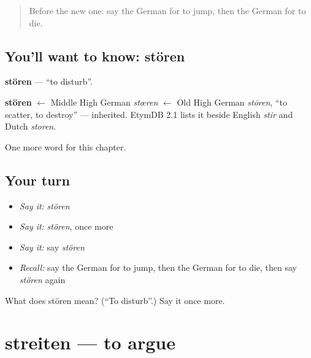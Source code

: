 \label{lesson:GE-C150-stoeren}



\begin{quote}
Before the new one: say the German for to jump, then the German for to die.
\end{quote}

\subsection*{You'll want to know: stören}
\textbf{stören} — \textquotedblleft{}to disturb\textquotedblright{}.

\begin{cousinweb}
\textbf{stören} $\leftarrow$ Middle High German \emph{stœren} $\leftarrow$ Old High German \emph{stōren}, \textquotedblleft{}to scatter, to destroy\textquotedblright{} — inherited. EtymDB 2.1 lists it beside English \emph{stir} and Dutch \emph{storen}.
\end{cousinweb}

\begin{grammarlens}[title={What you've built}]
One more word for this chapter.
\end{grammarlens}

\subsection*{Your turn}
\begin{itemize}
\raggedright
  \item \emph{Say it:} \emph{stören}
  \item \emph{Say it:} \emph{stören}, once more
  \item \emph{Say it:} say \emph{stören}
  \item \emph{Recall:} say the German for to jump, then the German for to die, then say \emph{stören} again
\end{itemize}

\begin{tcolorbox}[breakable,colback=teal!4,colframe=teal!35!black,title={Before you move on}]
What does stören mean? (\textquotedblleft{}To disturb\textquotedblright{}.) Say it once more.
\end{tcolorbox}
\section[streiten]{streiten — to argue}

\label{lesson:GE-C150-streiten}



